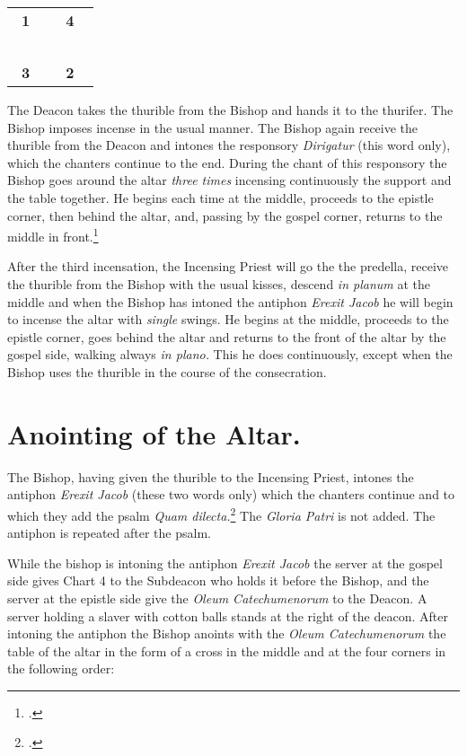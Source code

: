 \documentclass[letterpaper]{report}
\newcommand\crossplan{
\begin{center}
    \begin{tabular}{ | l c r | }
       \hline
       \cross\ \textbf{1} &                    & \textbf{4} \cross\ \\
                          &       \cross\      &                    \\
       \cross\ \textbf{3} &                    & \textbf{2} \cross\ \\
       \hline
   \end{tabular} 
\end{center}
}
\begin{document}
{\crossplan

\rubric The Deacon takes the thurible from the Bishop and hands it to the
thurifer. The Bishop imposes incense in the usual manner. The Bishop again
receive the thurible from the Deacon and intones the responsory
\textit{Dirigatur} (this word only), which the chanters continue to the end.
During the chant of this responsory the Bishop goes around the altar
\textit{three times} incensing continuously the support and the table together.
He begins each time at the middle, proceeds to the epistle corner, then behind
the altar, and, passing by the gospel corner, returns to the middle in
front.\footcite[If the back of the altar is attached to the wall, he begins at
the middle, incenses the support as fas as the epistle corner, afterwards the
table from the epistle to the gospel side, then the side of the altar at the
gospel side, then the side of the altar at the gospel corner and finally the
support from the gospel corner to the middle.][footnote 1, p. 96.]{consecranda}

\rubric After the third incensation, the Incensing Priest will go the the
predella, receive the thurible from the Bishop with the usual kisses, descend
\textit{in planum} at the middle and when the Bishop has intoned the antiphon
\textit{Erexit Jacob} he will begin to incense the altar with \textit{single}
swings. He begins at the middle, proceeds to the epistle corner, goes behind
the altar and returns to the front of the altar by the gospel side, walking
always \textit{in plano.} This he does continuously, except when the Bishop
uses the thurible in the course of the consecration.

\section{Anointing of the Altar.}

\rubric The Bishop, having given the thurible to the Incensing Priest, intones
the antiphon \textit{Erexit Jacob} (these two words only) which the chanters
continue and to which they add the psalm \textit{Quam dilecta.}\footcite[The
rubric appplied to psalm 42 above applied here as well.]{consecranda} The
\textit{Gloria Patri} is not added. The antiphon is repeated after the psalm.

\rubric While the bishop is intoning the antiphon \textit{Erexit Jacob} the
server at the gospel side gives Chart 4 to the Subdeacon who holds it before
the Bishop, and the server at the epistle side give the \textit{Oleum
Catechumenorum} to the Deacon. A server holding a slaver with cotton balls
stands at the right of the deacon. After intoning the antiphon the Bishop
anoints with the \textit{Oleum Catechumenorum} the table of the altar in the
form of a cross in the middle and at the four corners in the following order:

}
\end{document}
